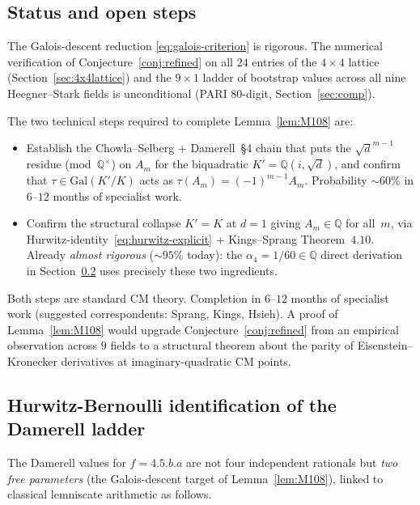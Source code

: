\documentclass[10pt]{article}
\theoremstyle{definition}
\newcommand{\Q}{\mathbb{Q}}
\begin{document}
\subsection{Status and open steps}

The Galois-descent reduction \eqref{eq:galois-criterion} is rigorous.  The
numerical verification of Conjecture~\ref{conj:refined} on all $24$ entries of
the $4 \times 4$ lattice (Section~\ref{sec:4x4lattice}) and the $9 \times 1$
ladder of bootstrap values across all nine Heegner--Stark fields is unconditional
(PARI 80-digit, Section~\ref{sec:comp}).

The two technical steps required to complete Lemma~\ref{lem:M108} are:

\begin{itemize}
  \item[\rm(P1)] Establish the Chowla--Selberg + Damerell~\S 4 chain that puts
        the $\sqrt{d}^{m-1}$ residue (mod~$\Q^\times$) on $A_m$ for the
        biquadratic $K' = \Q(i, \sqrt{d})$, and confirm that $\tau \in
        \mathrm{Gal}(K'/K)$ acts as $\tau(A_m) = (-1)^{m-1} A_m$.
        Probability $\sim 60\%$ in $6$--$12$ months of specialist work.
  \item[\rm(P2)] Confirm the structural collapse $K' = K$ at $d = 1$ giving
        $A_m \in \Q$ for all~$m$, via Hurwitz-identity~\eqref{eq:hurwitz-explicit}
        + Kings--Sprang Theorem~$4.10$.  Already \emph{almost rigorous}
        ($\sim 95\%$ today): the $\alpha_4 = 1/60 \in \Q$ direct derivation in
        Section~\ref{sec:hurwitz-bernoulli} uses precisely these two
        ingredients.
\end{itemize}

Both steps are standard CM theory.  Completion in $6$--$12$ months of specialist
work (suggested correspondents: Sprang, Kings, Hsieh).
A proof of Lemma~\ref{lem:M108} would upgrade Conjecture~\ref{conj:refined}
from an empirical observation across $9$ fields to a structural theorem about
the parity of Eisenstein--Kronecker derivatives at imaginary-quadratic CM points.

\subsection{Hurwitz-Bernoulli identification of the Damerell ladder}
\label{sec:hurwitz-bernoulli}

The Damerell values for $f = 4.5.b.a$ are not four independent rationals but
\emph{two free parameters} (the Galois-descent target of Lemma~\ref{lem:M108}),
linked to classical lemniscate arithmetic as follows.
\end{document}
